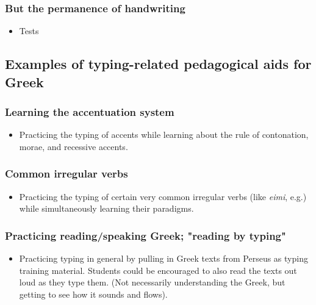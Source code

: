 \documentclass[11pt]{article}
\begin{document}
\subsubsection{But the permanence of handwriting}
\label{sec:org4d5cd8c}

\begin{itemize}
\item Tests
\end{itemize}

\subsection{Examples of typing-related pedagogical aids for Greek}
\label{sec:org47c3d02}

\subsubsection{Learning the accentuation system}
\label{sec:org3174b9d}

\begin{itemize}
\item Practicing the typing of accents while learning about the rule of contonation, morae, and recessive accents.
\end{itemize}

\subsubsection{Common irregular verbs}
\label{sec:org167c8f3}

\begin{itemize}
\item Practicing the typing of certain very common irregular verbs (like \emph{eimi}, e.g.) while simultaneously learning their paradigms.
\end{itemize}

\subsubsection{Practicing reading/speaking Greek; "reading by typing"}
\label{sec:orgb74334a}

\begin{itemize}
\item Practicing typing in general by pulling in Greek texts from Perseus as typing training material. Students could be encouraged to also read the texts out loud as they type them. (Not necessarily understanding the Greek, but getting to see how it sounds and flows).
\end{itemize}
\end{document}
